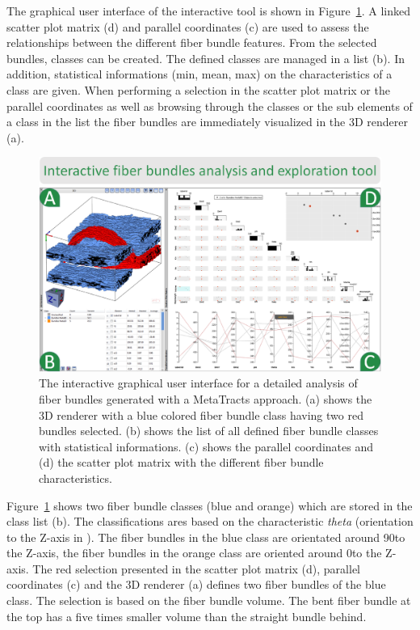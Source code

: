 The graphical user interface of the interactive tool is shown in Figure~\ref{fig:interactive_tool_gui}. A linked scatter plot matrix (d) and parallel coordinates (c) are used to assess the relationships between the different fiber bundle features. From the selected bundles, classes can be created. The defined classes are managed in a list (b). In addition, statistical informations (min, mean, max) on the characteristics of a class are given. When performing a selection in the scatter plot matrix or the parallel coordinates as well as browsing through the classes or the sub elements of a class in the list the fiber bundles are immediately visualized in the 3D renderer (a).
\begin{figure}[t]
	\centering
	\includegraphics[width=\linewidth]{images/FiberScout_GUI.eps}
	\caption{The interactive graphical user interface for a detailed analysis of fiber bundles generated with a MetaTracts approach. (a) shows the 3D renderer with a blue colored fiber bundle class having two red bundles selected. (b) shows the list of all defined fiber bundle classes with statistical informations. (c) shows the parallel coordinates and (d) the scatter plot matrix with the different fiber bundle characteristics.}
	\label{fig:interactive_tool_gui}
\end{figure}
Figure~\ref{fig:interactive_tool_gui} shows two fiber bundle classes (blue and orange) which are stored in the class list (b). The classifications ares based on the characteristic \textit{theta} (orientation to the Z-axis in \textdegree). The fiber bundles in the blue class are orientated around 90\textdegree to the Z-axis, the fiber bundles in the orange class are oriented around 0\textdegree to the Z-axis. The red selection presented in the scatter plot matrix (d), parallel coordinates (c) and the 3D renderer (a) defines two fiber bundles of the blue class. The selection is based on the fiber bundle volume. The bent fiber bundle at the top has a five times smaller volume than the straight bundle behind.    

